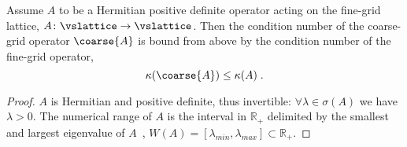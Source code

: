 \begin{theorem} \label{thm:cond:hpd}
Assume $A$ to be a Hermitian positive definite operator acting on the fine-grid lattice, $A \colon \vslattice \rightarrow \vslattice$. Then the condition number of the coarse-grid operator $\coarse{A}$ is bound from above by the condition number of the fine-grid operator,
\begin{equation}
\kappa(\coarse{A}) \leq \kappa(A) \;.
\end{equation}
\end{theorem}

\begin{proof}
$A$ is Hermitian and positive definite, thus invertible: $\forall \lambda \in \sigma(A)$ we have $\lambda > 0$.
The numerical range of $A$ is the interval in $\mathbb{R}_+$ delimited by the smallest and largest eigenvalue of $A$~\cite{gustafson1997numerical}, \ie $W(A) = [ \lambda_{min}, \lambda_{max} ] \subset \mathbb{R}_+$.

\end{proof}
